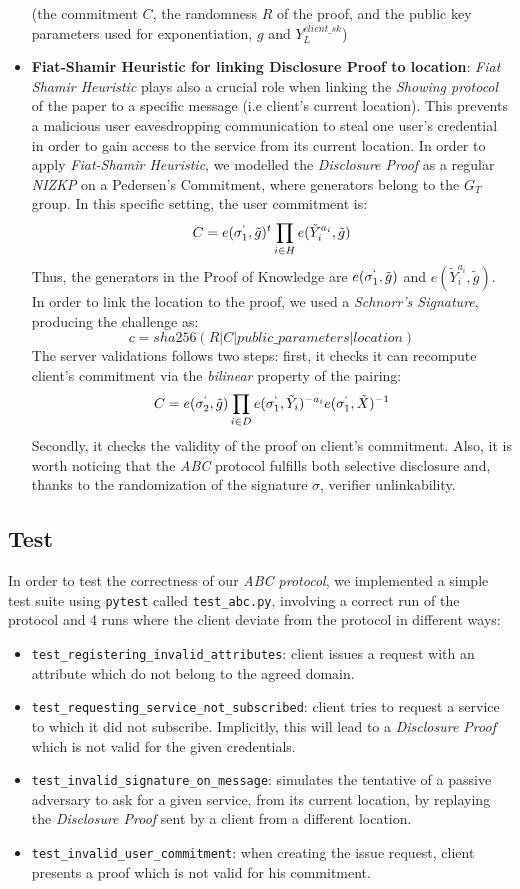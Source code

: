 \documentclass[10pt,conference,compsocconf]{IEEEtran}
\begin{document}
\begin{itemize}
    (the commitment $C$, the randomness $R$ of the proof, and the public key parameters used for exponentiation, $g$ and $Y_{L}^{client\_sk}$)
    \item \textbf{Fiat-Shamir Heuristic for linking Disclosure Proof to location}: \textit{Fiat Shamir Heuristic} plays also a crucial role when
    linking the \textit{Showing protocol} of the paper to a specific message (i.e client's current location). This prevents a malicious user
    eavesdropping communication to steal one user's credential in order to gain access to the service from its current location.
    In order to apply \textit{Fiat-Shamir Heuristic}, we modelled the \textit{Disclosure Proof} as a regular \textit{NIZKP} on a Pedersen's Commitment,
    where generators belong to the $G_T$ group.\newline
    In this specific setting, the user commitment is: \[C=e(\sigma_{1}^{`}, \tilde{g})^t\prod_{i \in H}e(\tilde{Y}_{i}^{a_i},\tilde{g})\]Thus,
    the generators in the Proof of Knowledge are $e(\sigma_{1}^{`}, \tilde{g})$ and $e(\tilde{Y}_{i}^{a_i},\tilde{g})$.
    In order to link the location to the proof, we used a \textit{Schnorr's Signature}, producing the challenge as:
    \[c = sha256(R|C|public\_parameters|location)\]
    The server validations follows two steps: first, it checks it can recompute client's commitment via the \textit{bilinear} property of the pairing:
    \[C = e(\sigma_2^`,\tilde{g})\prod_{i \in D}e(\sigma_1^`,\tilde{Y}_i)^{-a_i}e(\sigma_1^`,\tilde{X})^{-1}\]
    Secondly, it checks the validity of the proof on client's commitment. Also, it is worth noticing that the \textit{ABC} protocol fulfills both selective disclosure and, thanks to the randomization of the signature $\sigma$, verifier unlinkability.
\end{itemize}
\subsection{Test}
In order to test the correctness of our \textit{ABC protocol}, we implemented a simple test suite using \texttt{pytest} called \texttt{test\_abc.py},
involving a correct run of the protocol and 4 runs where the client deviate from the protocol in different ways:
\begin{itemize}
    \item \texttt{test\_registering\_invalid\_attributes}: client issues a request with an attribute which do not belong to the agreed domain.
    \item \texttt{test\_requesting\_service\_not\_subscribed}: client tries to request a service to which it did not subscribe.
    Implicitly, this will lead to a \textit{Disclosure Proof} which is not valid for the given credentials.
    \item \texttt{test\_invalid\_signature\_on\_message}: simulates the tentative of a passive adversary to ask for a given service, from its current
    location, by replaying the \textit{Disclosure Proof} sent by a client from a different location.
    \item \texttt{test\_invalid\_user\_commitment}: when creating the issue request, client presents a proof which is not valid for his commitment.
\end{itemize}
\end{document}
